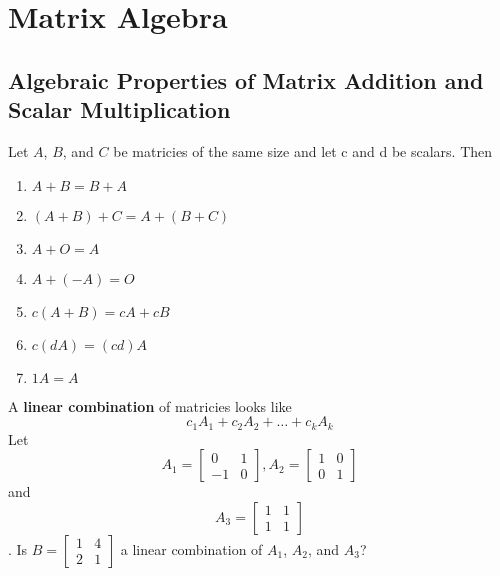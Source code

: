 \section{Matrix Algebra}
\subsection*{Algebraic Properties of Matrix Addition and Scalar Multiplication}
Let $A$, $B$, and $C$ be matricies of the same size and let c and d be scalars. Then 
\begin{enumerate}[a]
    \item $A + B = B+A$
    \item $(A+B)+C = A + (B+C)$
    \item $A+O = A$
    \item $A+(-A) = O$
    \item $c(A+B) = cA + cB$
    \item $c(dA) = (cd)A$
    \item $1A = A$
\end{enumerate}
A \textbf{linear combination} of matricies looks like
$$c_1A_1 + c_2A_2 + \dots + c_kA_k$$
Let $$A_1 = \begin{bmatrix}
    0&1\\-1&0
\end{bmatrix}, A_2 = \begin{bmatrix}
    1&0\\0&1
\end{bmatrix}$$ and $$A_3  = \begin{bmatrix}
    1&1\\1&1
\end{bmatrix}$$. Is $B = \begin{bmatrix}
    1&4\\2&1
\end{bmatrix}$ a linear combination of $A_1$, $A_2$, and $A_3$?\\

